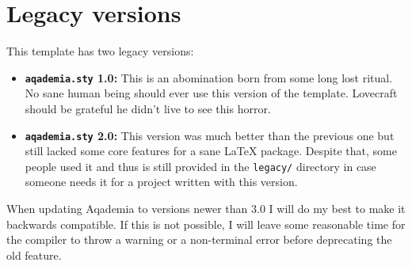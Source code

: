 \chapter{Legacy versions}

This template has two legacy versions:

\begin{itemize}
	\item\textbf{\texttt{aqademia.sty} 1.0:} This is an abomination born from some long lost ritual. No sane human being should ever use this version of the template. Lovecraft should be grateful he didn't live to see this horror.
	\item\textbf{\texttt{aqademia.sty} 2.0:} This version was much better than the previous one but still lacked some core features for a sane LaTeX package. Despite that, some people used it and thus is still provided in the \texttt{legacy/} directory in case someone needs it for a project written with this version.
\end{itemize}

When updating Aqademia to versions newer than 3.0 I will do my best to make it backwards compatible.
If this is not possible, I will leave some reasonable time for the compiler to throw a warning or a non-terminal error before deprecating the old feature.
